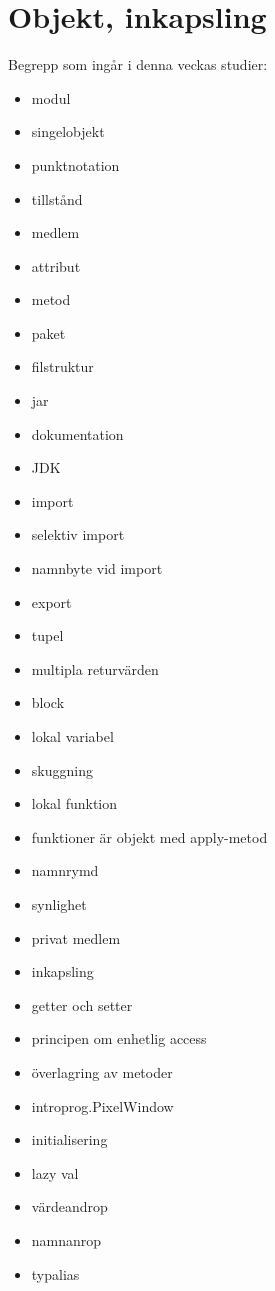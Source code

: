 \chapter{Objekt, inkapsling}\label{chapter:W04}
Begrepp som ingår i denna veckas studier:
\begin{multicols}{2}\begin{itemize}[noitemsep,label={$\square$},leftmargin=*]
\item modul
\item singelobjekt
\item punktnotation
\item tillstånd
\item medlem
\item attribut
\item metod
\item paket
\item filstruktur
\item jar
\item dokumentation
\item JDK
\item import
\item selektiv import
\item namnbyte vid import
\item export
\item tupel
\item multipla returvärden
\item block
\item lokal variabel
\item skuggning
\item lokal funktion
\item funktioner är objekt med apply-metod
\item namnrymd
\item synlighet
\item privat medlem
\item inkapsling
\item getter och setter
\item principen om enhetlig access
\item överlagring av metoder
\item introprog.PixelWindow
\item initialisering
\item lazy val
\item värdeandrop
\item namnanrop
\item typalias\end{itemize}\end{multicols}
